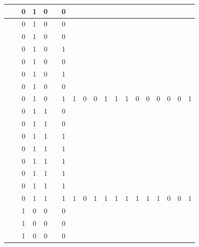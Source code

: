 \begin{table}[!tb]
\begin{tabular}{|c|c|c|c|c|c|c|c|c|c|c|c|c|c|c|c|c|c|c|}
        \rowcolor{red!40}  &  & 0 & 1 & 0 &  & 0 &  &  &  &  &  &  &  &  &  &  &  &  \\ \hline
        \rowcolor{red!40}  &  & 0 & 1 & 0 &  & 0 &  &  &  &  &  &  &  &  &  &  &  &  \\ \hline
        \rowcolor{red!40}  &  & 0 & 1 & 0 &  & 0 &  &  &  &  &  &  &  &  &  &  &  &  \\ \hline
        \rowcolor{red!40}  &  & 0 & 1 & 0 &  & 1 &  &  &  &  &  &  &  &  &  &  &  &  \\ \hline
        \rowcolor{red!40}  &  & 0 & 1 & 0 &  & 0 &  &  &  &  &  &  &  &  &  &  &  &  \\ \hline
        \rowcolor{red!40}  &  & 0 & 1 & 0 &  & 1 &  &  &  &  &  &  &  &  &  &  &  &  \\ \hline
        \rowcolor{red!40}  &  & 0 & 1 & 0 &  & 0 &  &  &  &  &  &  &  &  &  &  &  &  \\ \hline
        \rowcolor{red!40}  &  & 0 & 1 & 0 &  & 1 & 1 & 0 & 0 & 1 & 1 & 1 & 0 & 0 & 0 & 0 & 0 & 1 \\ \hline
        \rowcolor{green!40}  &  & 0 & 1 & 1 &  & 0 &  &  &  &  &  &  &  &  &  &  &  &  \\ \hline
        \rowcolor{green!40}  &  & 0 & 1 & 1 &  & 0 &  &  &  &  &  &  &  &  &  &  &  &  \\ \hline
        \rowcolor{green!40}  &  & 0 & 1 & 1 &  & 1 &  &  &  &  &  &  &  &  &  &  &  &  \\ \hline
        \rowcolor{green!40}  &  & 0 & 1 & 1 &  & 1 &  &  &  &  &  &  &  &  &  &  &  &  \\ \hline
        \rowcolor{green!40}  &  & 0 & 1 & 1 &  & 1 &  &  &  &  &  &  &  &  &  &  &  &  \\ \hline
        \rowcolor{green!40}  &  & 0 & 1 & 1 &  & 1 &  &  &  &  &  &  &  &  &  &  &  &  \\ \hline
        \rowcolor{green!40}  &  & 0 & 1 & 1 &  & 1 &  &  &  &  &  &  &  &  &  &  &  &  \\ \hline
        \rowcolor{green!40}  &  & 0 & 1 & 1 &  & 1 & 1 & 0 & 1 & 1 & 1 & 1 & 1 & 1 & 1 & 0 & 0 & 1 \\ \hline
        \rowcolor{yellow!40}  &  & 1 & 0 & 0 &  & 0 &  &  &  &  &  &  &  &  &  &  &  &  \\ \hline
        \rowcolor{yellow!40}  &  & 1 & 0 & 0 &  & 0 &  &  &  &  &  &  &  &  &  &  &  &  \\ \hline
        \rowcolor{yellow!40}  &  & 1 & 0 & 0 &  & 0 &  &  &  &  &  &  &  &  &  &  &  &  \\ \hline

\end{tabular}
\end{table}
